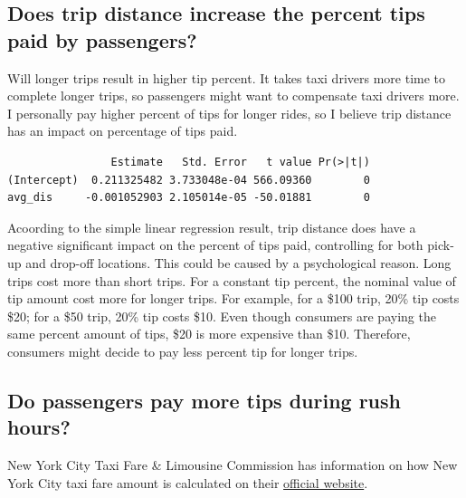 \documentclass[12pt,twoside]{reedthesis}
\theoremstyle{definition}
\theoremstyle{definition}
\theoremstyle{definition}
\theoremstyle{remark}
\begin{document}
\subsection{Does trip distance increase the percent tips paid by
passengers?}\label{does-trip-distance-increase-the-percent-tips-paid-by-passengers}

Will longer trips result in higher tip percent. It takes taxi drivers
more time to complete longer trips, so passengers might want to
compensate taxi drivers more. I personally pay higher percent of tips
for longer rides, so I believe trip distance has an impact on percentage
of tips paid.
\begin{verbatim}
                Estimate   Std. Error   t value Pr(>|t|)
(Intercept)  0.211325482 3.733048e-04 566.09360        0
avg_dis     -0.001052903 2.105014e-05 -50.01881        0
\end{verbatim}
Acoording to the simple linear regression result, trip distance does
have a negative significant impact on the percent of tips paid,
controlling for both pick-up and drop-off locations. This could be
caused by a psychological reason. Long trips cost more than short trips.
For a constant tip percent, the nominal value of tip amount cost more
for longer trips. For example, for a \$100 trip, 20\% tip costs \$20;
for a \$50 trip, 20\% tip costs \$10. Even though consumers are paying
the same percent amount of tips, \$20 is more expensive than \$10.
Therefore, consumers might decide to pay less percent tip for longer
trips.

\subsection{Do passengers pay more tips during rush
hours?}\label{do-passengers-pay-more-tips-during-rush-hours}

New York City Taxi Fare \& Limousine Commission has information on how
New York City taxi fare amount is calculated on their
\href{http://www.nyc.gov/html/tlc/html/passenger/taxicab_rate.shtml}{official
website}.
\end{document}
